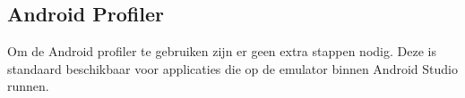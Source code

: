 \subsection{Android Profiler}
Om de Android profiler te gebruiken zijn er geen extra stappen nodig. Deze is standaard beschikbaar voor applicaties 
die op de emulator binnen Android Studio runnen.